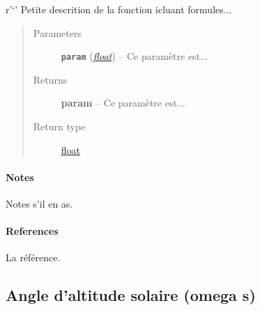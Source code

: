 \documentclass[letterpaper,10pt,english]{sphinxmanual}
\begin{document}
\begin{fulllineitems}
\label{python:solar_mod.angle_reflechi}
r'`' Petite descrition de la fonction icluant formules...
\begin{quote}\begin{description}
\item[{Parameters}] \leavevmode
\textbf{\texttt{param}} (\href{https://docs.python.org/library/functions.html\#float}{\emph{float}}) -- Ce paramètre est...

\item[{Returns}] \leavevmode
\textbf{param} -- Ce paramètre est...

\item[{Return type}] \leavevmode
\href{https://docs.python.org/library/functions.html\#float}{float}

\end{description}\end{quote}
\paragraph{Notes}

Notes s'il en as.
\paragraph{References}

La référence.

\end{fulllineitems}



\subsection{Angle d'altitude solaire (omega s)}
\label{python:angle-d-altitude-solaire-omega-s}
\end{document}
